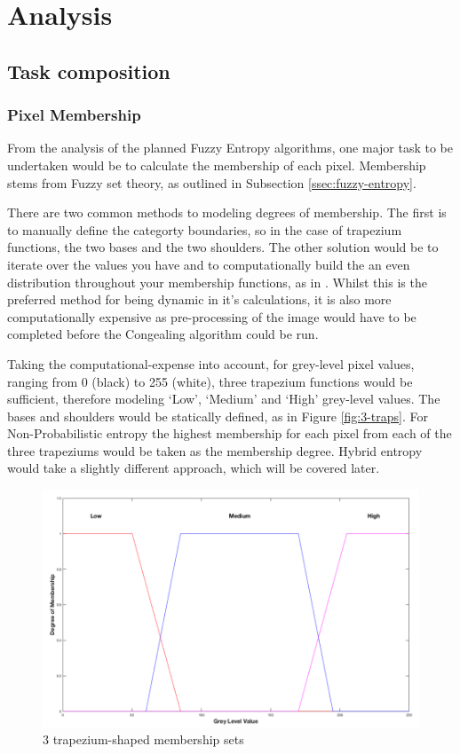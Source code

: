 \section{Analysis}

\subsection{Task composition}

\subsubsection{Pixel Membership}

From the analysis of the planned Fuzzy Entropy algorithms, one major task to be undertaken would be to calculate the membership of each pixel. Membership stems from Fuzzy set theory, as outlined in Subsection \ref{ssec:fuzzy-entropy}.

There are two common methods to modeling degrees of membership. The first is to manually define the categorty boundaries, so in the case of trapezium functions, the two bases and the two shoulders. The other solution would be to iterate over the values you have and to computationally build the an even distribution throughout your membership functions, as in \cite{Mac_Parthalain_Strange_2013}. Whilst this is the preferred method for being dynamic in it's calculations, it is also more computationally expensive as pre-processing of the image would have to be completed before the Congealing algorithm could be run.

Taking the computational-expense into account, for grey-level pixel values, ranging from 0 (black) to 255 (white), three trapezium functions would be sufficient, therefore modeling `Low', `Medium' and `High' grey-level values. The bases and shoulders would be statically defined, as in Figure \ref{fig:3-traps}. For Non-Probabilistic entropy the highest membership for each pixel from each of the three trapeziums would be taken as the membership degree. Hybrid entropy would take a slightly different approach, which will be covered later.

\begin{figure}[H]
  \center
  \includegraphics[scale=0.4]{Chapter2/hybrid-img/3_traps.png}
  \caption{3 trapezium-shaped membership sets}
  \label{fig:3-trapeziums}
\end{figure}

